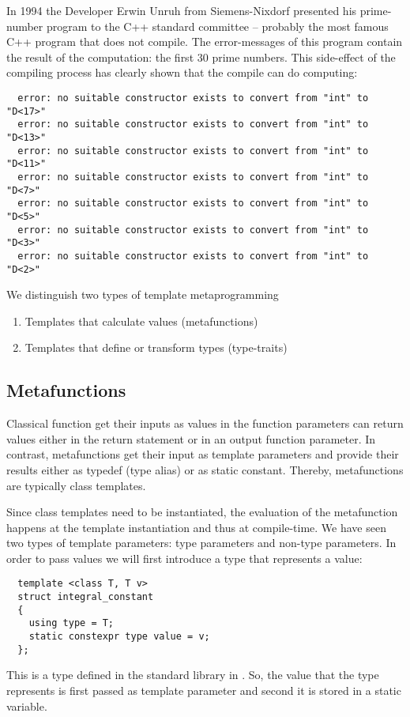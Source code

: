 \begin{example}
  In 1994 the Developer Erwin Unruh from Siemens-Nixdorf presented his prime-number program to the C++ standard committee -- probably the most famous
  C++ program that does not compile. The error-messages of this program contain the result of the computation: the first 30 prime numbers. This side-effect
  of the compiling process has clearly shown that the compile can do computing:
  \begin{verbatim}
  error: no suitable constructor exists to convert from "int" to "D<17>"
  error: no suitable constructor exists to convert from "int" to "D<13>"
  error: no suitable constructor exists to convert from "int" to "D<11>"
  error: no suitable constructor exists to convert from "int" to "D<7>"
  error: no suitable constructor exists to convert from "int" to "D<5>"
  error: no suitable constructor exists to convert from "int" to "D<3>"
  error: no suitable constructor exists to convert from "int" to "D<2>"
  \end{verbatim}
\end{example}

We distinguish two types of template metaprogramming
\begin{enumerate}
  \item Templates that calculate values (metafunctions)
  \item Templates that define or transform types (type-traits)
\end{enumerate}


\subsection{Metafunctions}
Classical function get their inputs as values in the function parameters can return values either in the return statement or in an output
function parameter. In contrast, metafunctions get their input as template parameters and provide their results either as typedef (type alias)
or as static constant. Thereby, metafunctions are typically class templates.

Since class templates need to be instantiated, the evaluation of the metafunction happens at the template instantiation and thus at compile-time.
We have seen two types of template parameters: type parameters and non-type parameters. In order to pass values we will first introduce a type
that represents a value:
%
\begin{verbatim}
  template <class T, T v>
  struct integral_constant
  {
    using type = T;
    static constexpr type value = v;
  };
\end{verbatim}
%
This is a type defined in the standard library in . So, the value that the type represents is first passed as template parameter
and second it is stored in a static  variable.

